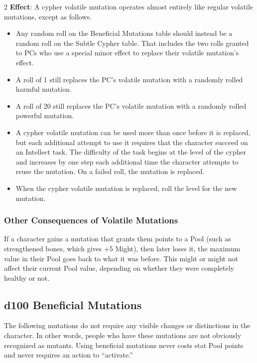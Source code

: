 \begin{multicols}{2}
\textbf{Effect}: A cypher volatile mutation operates almost entirely like regular volatile mutations, except as follows. 
\begin{itemize}    
\item Any random roll on the Beneficial Mutations table should instead be a random roll on the Subtle Cypher table. That includes the two rolls granted to PCs who use a special minor effect to replace their volatile mutation’s effect. 
\item A roll of 1 still replaces the PC’s volatile mutation with a randomly rolled harmful mutation. 
\item A roll of 20 still replaces the PC’s volatile mutation with a randomly rolled powerful mutation. 
\item A cypher volatile mutation can be used more than once before it is replaced, but each additional attempt to use it requires that the character succeed on an Intellect task. The difficulty of the task begins at the level of the cypher and increases by one step each additional time the character attempts to reuse the mutation. On a failed roll, the mutation is replaced. 
\item When the cypher volatile mutation is replaced, roll the level for the new mutation. 
\end{itemize}

\subsubsection{Other Consequences of Volatile Mutations}

If a character gains a mutation that grants them points to a Pool (such as strengthened bones, which gives +5 Might), then later loses it, the maximum value in their Pool goes back to what it was before. This might or might not affect their current Pool value, depending on whether they were completely healthy or not.

\subsection{d100 Beneficial Mutations}

The following mutations do not require any visible changes or distinctions in the character. In other words, people who have these mutations are not obviously recognized as mutants. Using beneficial mutations never costs stat Pool points and never requires an action to “activate.”

\end{multicols}

